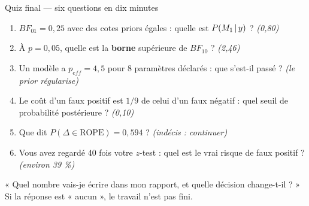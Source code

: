 \begin{frame}{Quiz final --- six questions en dix minutes}
\begin{qbox}
\begin{enumerate}
  \item $BF_{01} = 0{,}25$ avec des cotes priors égales : quelle est
        $P(M_1 \,\vert\, y)$ ? \hfill \textit{(0,80)}
  \item À $p = 0{,}05$, quelle est la \textbf{borne} supérieure de $BF_{10}$ ?
        \hfill \textit{(2,46)}
  \item Un modèle a $p_{eff} = 4{,}5$ pour 8 paramètres déclarés : que
        s'est-il passé ? \hfill \textit{(le prior régularise)}
  \item Le coût d'un faux positif est $1/9$ de celui d'un faux négatif :
        quel seuil de probabilité postérieure ? \hfill \textit{(0,10)}
  \item Que dit $P(\Delta \in \mathrm{ROPE}) = 0{,}594$ ?
        \hfill \textit{(indécis : continuer)}
  \item Vous avez regardé 40 fois votre $z$-test : quel est le vrai risque
        de faux positif ? \hfill \textit{(environ 39 \%)}
\end{enumerate}
\end{qbox}
\vspace{1mm}
\begin{kbox}
« Quel nombre vais-je écrire dans mon rapport, et quelle décision
change-t-il ? » Si la réponse est « aucun », le travail n'est pas fini.
\end{kbox}
\end{frame}

